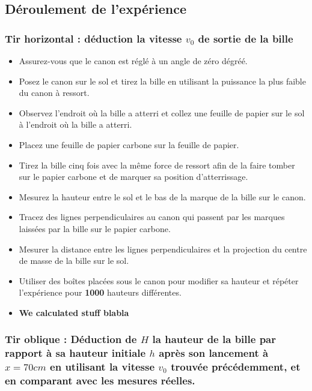 \documentclass[12pt,a4paper]{article}
\begin{document}
    \subsection{Déroulement de l'expérience}
    \subsubsection{Tir horizontal : déduction la vitesse $v_0$ de sortie de la bille}
    \begin{itemize}
        \item Assurez-vous que le canon est réglé à un angle de zéro dégréé.
        \item Posez le canon sur le sol et tirez la bille en utilisant la puissance la plus faible du canon à ressort.
        \item Observez l'endroit où la bille a atterri et collez une feuille de papier sur le sol à l'endroit où la bille a atterri.
        \item Placez une feuille de papier carbone sur la feuille de papier.
        \item Tirez la bille cinq fois avec la même force de ressort afin de la faire tomber sur le papier carbone et de marquer sa position d'atterrissage.
        \item Mesurez la hauteur entre le sol et le bas de la marque de la bille sur le canon.
        \item Tracez des lignes perpendiculaires au canon qui passent par les marques laissées par la bille sur le papier carbone.
        \item Mesurer la distance entre les lignes perpendiculaires et la projection du centre de masse de la bille sur le sol.
        \item Utiliser des boîtes placées sous le canon pour modifier sa hauteur et répéter l'expérience pour \textbf{1000} hauteurs différentes.
        \item \textbf{We calculated stuff blabla}
    \end{itemize}

    \subsubsection{Tir oblique : Déduction de $H$ la hauteur de la bille par rapport à sa hauteur initiale $h$ après son lancement à $x = 70cm$ en utilisant la vitesse $v_0$ trouvée précédemment, et en comparant avec les mesures réelles.}
\end{document}
